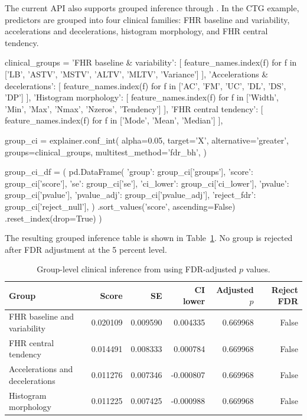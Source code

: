 The current  API also supports grouped inference through
. In the CTG example, predictors are grouped into four clinical
families: FHR baseline and variability, accelerations and decelerations,
histogram morphology, and FHR central tendency.
%
\begin{Code}
clinical_groups = {
    'FHR baseline & variability': [
        feature_names.index(f)
        for f in ['LB', 'ASTV', 'MSTV', 'ALTV', 'MLTV', 'Variance']
    ],
    'Accelerations & decelerations': [
        feature_names.index(f)
        for f in ['AC', 'FM', 'UC', 'DL', 'DS', 'DP']
    ],
    'Histogram morphology': [
        feature_names.index(f)
        for f in ['Width', 'Min', 'Max', 'Nmax', 'Nzeros', 'Tendency']
    ],
    'FHR central tendency': [
        feature_names.index(f)
        for f in ['Mode', 'Mean', 'Median']
    ],
}

group_ci = explainer.conf_int(
    alpha=0.05,
    target='X',
    alternative='greater',
    groups=clinical_groups,
    multitest_method='fdr_bh',
)

group_ci_df = (
    pd.DataFrame({
        'group': group_ci['groups'],
        'score': group_ci['score'],
        'se': group_ci['se'],
        'ci_lower': group_ci['ci_lower'],
        'pvalue': group_ci['pvalue'],
        'pvalue_adj': group_ci['pvalue_adj'],
        'reject_fdr': group_ci['reject_null'],
    })
    .sort_values('score', ascending=False)
    .reset_index(drop=True)
)
\end{Code}
%
The resulting grouped inference table is shown in
Table~\ref{tab:group-inference}. No group is rejected after FDR adjustment at
the 5 percent level.

\begin{table}[t!]
\centering
\small
\begin{tabular}{p{4.0cm}rrrrr}
\hline
Group & Score & SE & CI lower & Adjusted $p$ & Reject FDR \\ \hline
FHR baseline and variability & 0.020109 & 0.009590 & 0.004335 & 0.669968 & False \\
FHR central tendency & 0.014491 & 0.008333 & 0.000784 & 0.669968 & False \\
Accelerations and decelerations & 0.011276 & 0.007346 & -0.000807 & 0.669968 & False \\
Histogram morphology & 0.011225 & 0.007425 & -0.000988 & 0.669968 & False \\ \hline
\end{tabular}
\caption{\label{tab:group-inference} Group-level clinical inference from
 using FDR-adjusted $p$ values.}
\end{table}

